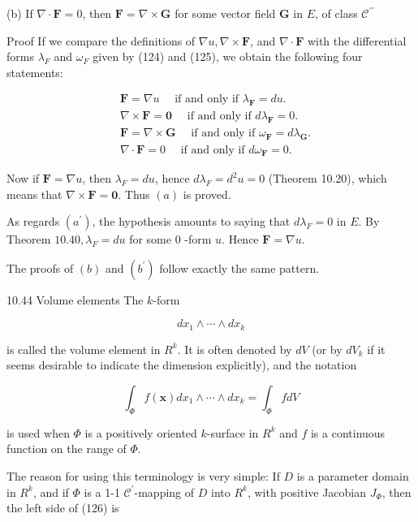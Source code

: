 \documentclass[10pt]{article}
\begin{document}
(b) If $\nabla \cdot \mathbf{F}=0$, then $\mathbf{F}=\nabla \times \mathbf{G}$ for some vector field $\mathbf{G}$ in $E$, of class $\mathscr{C}^{\prime \prime}$

Proof If we compare the definitions of $\nabla u, \nabla \times \mathbf{F}$, and $\nabla \cdot \mathbf{F}$ with the differential forms $\lambda_{F}$ and $\omega_{F}$ given by (124) and (125), we obtain the following four statements:

$$
\begin{aligned}
& \mathbf{F}=\nabla u \quad \text { if and only if } \lambda_{\mathbf{F}}=d u . \\
& \nabla \times \mathbf{F}=\mathbf{0} \quad \text { if and only if } d \lambda_{\mathbf{F}}=0 \text {. } \\
& \mathbf{F}=\nabla \times \mathbf{G} \quad \text { if and only if } \omega_{\mathbf{F}}=d \lambda_{\mathbf{G}} . \\
& \nabla \cdot \mathbf{F}=0 \quad \text { if and only if } d \omega_{\mathbf{F}}=0 \text {. }
\end{aligned}
$$

Now if $\mathbf{F}=\nabla u$, then $\lambda_{F}=d u$, hence $d \lambda_{F}=d^{2} u=0$ (Theorem 10.20), which means that $\nabla \times \mathbf{F}=\mathbf{0}$. Thus $(a)$ is proved.

As regards $\left(a^{\prime}\right)$, the hypothesis amounts to saying that $d \lambda_{F}=0$ in $E$. By Theorem $10.40, \lambda_{F}=d u$ for some 0 -form $u$. Hence $\mathbf{F}=\nabla u$.

The proofs of $(b)$ and $\left(b^{\prime}\right)$ follow exactly the same pattern.

10.44 Volume elements The $k$-form

$$
d x_{1} \wedge \cdots \wedge d x_{k}
$$

is called the volume element in $R^{k}$. It is often denoted by $d V$ (or by $d V_{k}$ if it seems desirable to indicate the dimension explicitly), and the notation

$$
\int_{\Phi} f(\mathbf{x}) d x_{1} \wedge \cdots \wedge d x_{k}=\int_{\Phi} f d V
$$

is used when $\Phi$ is a positively oriented $k$-surface in $R^{k}$ and $f$ is a continuous function on the range of $\Phi$.

The reason for using this terminology is very simple: If $D$ is a parameter domain in $R^{k}$, and if $\Phi$ is a 1-1 $\mathscr{C}^{\prime}$-mapping of $D$ into $R^{k}$, with positive Jacobian $J_{\Phi}$, then the left side of (126) is
\end{document}
